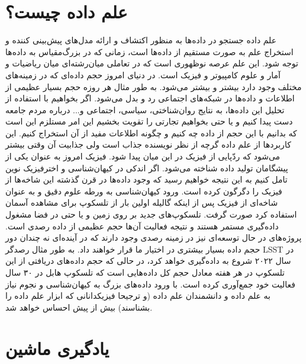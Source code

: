 
\section{علم داده چیست؟}
\label{sec:ds}
علم داده 
جستجو در داده‌ها به منظور اکتشاف و ارائه مدل‌های پیش‌بینی کننده و استخراج علم به صورت مستقیم از داده‌ها است، زمانی که در بزرگ‌مقیاس به داده‌ها توجه شود. این علم عرصه نوظهوری است که در تعاملی میان‌رشته‌ای میان ریاضیات و آمار و علوم کامپیوتر و فیزیک است. در دنیای امروز حجم داده‌ای که در زمینه‌های مختلف وجود دارد بیشتر و بیشتر می‌شود. به طور مثال هر روزه حجم بسیار عظیمی از اطلاعات و داده‌ها در شبکه‌های اجتماعی رد و بدل می‌شود. اگر بخواهیم با استفاده از تحلیل این داده‌ها، به نتایج روان‌شناختی، سیاسی، اجتماعی و... درباره مردم جامعه دست پیدا کنیم و یا حتی بخواهیم تجارتی را تقویت بخشیم این امر مستلزم این است که بدانیم با این حجم از داده چه کنیم و چگونه اطلاعات مفید از آن استخراج کنیم. این کاربردها از علم داده گرچه از نظر نویسنده جذاب است ولی جذابیت آن وقتی بیشتر می‌شود که ردّپایی از فیزیک در این میان پیدا شود. فیزیک امروز به عنوان یکی از پیشگامان تولید داده شناخته می‌شود. اگر اندکی در کیهان‌شناسی و اخترفیزیک نوین تامل کنیم به این نتیجه خواهیم رسید که وجود داده‌ها در قرن گذشته این شاخه‌ها از فیزیک را دگرگون کرده است. ورود کیهان‌شناسی به ورطه علوم دقیق و به عنوان شاخه‌ای از فیزیک پس از اینکه گالیله اولین بار از تلسکوپ برای مشاهده آسمان استفاده کرد صورت گرفت. تلسکوپ‌های جدید بر روی زمین و یا حتی در فضا مشغول داده‌گیری مستمر هستند و نتیجه فعالیت آن‌ها حجم عظیمی از داده رصدی است. پروژه‌های در حال توسعه‌ای نیز در زمینه رصدی وجود دارند که در آینده‌ای نه چندان دور حجم داده بسیار بیشتری در اختیار ما قرار خواهند داد. به طور مثال رصدگر LSST
در سال ۲۰۲۲ شروع به داده‌گیری خواهد کرد، در حالی که حجم داده‌های دریافتی از این تلسکوپ در هر هفته معادل حجم کل داده‌هایی است که تلسکوپ هابل در ۳۰ سال فعالیت خود جمع‌آوری کرده است. با ورود داده‌های بزرگ به کیهان‌شناسی و نجوم نیاز به علم داده و دانشمندان علم داده (و ترجیحا فیزیکدانانی که ابزار علم داده را بشناسند) بیش از پیش احساس خواهد شد.

\section{یادگیری ماشین}
\label{machine_learning}


